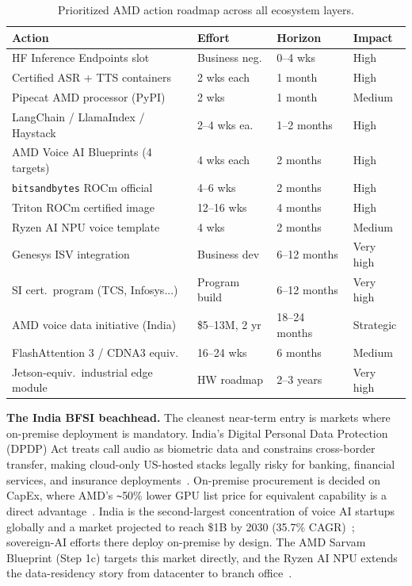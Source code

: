 \documentclass[blind]{gtac}
\begin{document}
\begin{table}[H]
\centering
\caption{Prioritized AMD action roadmap across all ecosystem layers.}
\label{tab:roadmap}
\tiny
\begin{tabular}{@{}p{1.38in}p{0.62in}p{0.62in}p{0.52in}@{}}
\toprule
Action & Effort & Horizon & Impact \\
\midrule
HF Inference Endpoints slot & Business neg. & 0--4 wks & High \\
Certified ASR + TTS containers & 2 wks each & 1 month & High \\
Pipecat AMD processor (PyPI) & 2 wks & 1 month & Medium \\
LangChain / LlamaIndex / Haystack & 2--4 wks ea. & 1--2 months & High \\
AMD Voice AI Blueprints (4 targets) & 4 wks each & 2 months & High \\
\texttt{bitsandbytes} ROCm official & 4--6 wks & 2 months & High \\
Triton ROCm certified image & 12--16 wks & 4 months & High \\
Ryzen AI NPU voice template & 4 wks & 2 months & Medium \\
Genesys ISV integration & Business dev & 6--12 months & Very high \\
SI cert.\ program (TCS, Infosys...) & Program build & 6--12 months & Very high \\
AMD voice data initiative (India) & \$5--13M, 2 yr & 18--24 months & Strategic \\
FlashAttention 3 / CDNA3 equiv. & 16--24 wks & 6 months & Medium \\
Jetson-equiv.\ industrial edge module & HW roadmap & 2--3 years & Very high \\
\bottomrule
\end{tabular}
\end{table}

\textbf{The India BFSI beachhead.}
The cleanest near-term entry is markets where on-premise deployment is mandatory. India's Digital Personal Data Protection (DPDP) Act treats call audio as biometric data and constrains cross-border transfer, making cloud-only US-hosted stacks legally risky for banking, financial services, and insurance deployments~\cite{dpdp_checklist}. On-premise procurement is decided on CapEx, where AMD's \texttt{\textasciitilde}50\% lower GPU list price for equivalent capability is a direct advantage~\cite{india_guide}. India is the second-largest concentration of voice AI startups globally and a market projected to reach \$1B by 2030 (35.7\% CAGR)~\cite{slator_sarvam,india_guide}; sovereign-AI efforts there deploy on-premise by design. The AMD Sarvam Blueprint (Step 1c) targets this market directly, and the Ryzen AI NPU extends the data-residency story from datacenter to branch office~\cite{amd_ryzen_whisper}.
\end{document}
